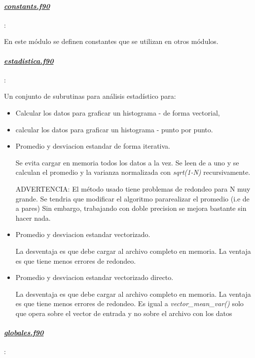 \paragraph{\underline{\textit{constants.f90}}}:

 En este módulo se definen constantes que se utilizan en otros módulos. 

\paragraph{\underline{\textit{estadistica.f90}}}:

Un conjunto de subrutinas para análisis estad\'istico para:
\begin{itemize}
	\item{Calcular los datos para graficar un histograma - de forma vectorial},  
	\item{calcular los datos para graficar un histograma - punto por punto}.

	\item{Promedio y desviacion estandar de forma iterativa.}

 Se evita cargar en memoria todos los datos a la vez. Se leen de a uno y se 
 calculan el promedio y la varianza normalizada con \textit{sqrt(1-N)} recursivamente. 

 ADVERTENCIA: El método usado tiene problemas de redondeo para N muy grande.
 Se tendria que modificar el algoritmo pararealizar el promedio (i.e de a pares)
 Sin embargo, trabajando con doble precision se mejora bastante sin hacer nada.

 \item{Promedio y desviacion estandar vectorizado.}

 La desventaja es que debe cargar al archivo completo en memoria. La ventaja es
 que tiene menos errores de redondeo.

 \item{Promedio y desviacion estandar vectorizado directo.}

 La desventaja es que debe cargar al archivo completo en memoria. La ventaja es
 que tiene menos errores de redondeo.
 Es igual a \textit{vector\_mean\_var()} solo que opera sobre el vector de entrada
 y no sobre el archivo con los datos

\end{itemize}

\paragraph{\underline{\textit{globales.f90}}}:

